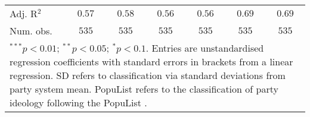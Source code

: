 \begin{table}[htb]
\begin{center}
\begin{tabular}{l c c c c c c}
Adj. R$^2$     & $0.57$         & $0.58$        & $0.56$        & $0.56$        & $0.69$        & $0.69$        \\
Num. obs.      & $535$          & $535$         & $535$         & $535$         & $535$         & $535$         \\
\hline
\multicolumn{7}{l}{\scriptsize{\parbox{.8\linewidth}{$^{***}p<0.01$; $^{**}p<0.05$; $^{*}p<0.1$. Entries are unstandardised regression coefficients with standard errors in brackets from a linear regression. SD refers to classification via standard deviations from party system mean. PopuList refers to the classification of party ideology following the PopuList \citep{Rooduijn.2019a}.}}}
\end{tabular}
\label{t:ideology}
\end{center}
\end{table}
